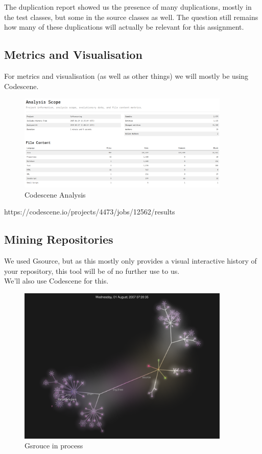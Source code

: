 \documentclass{article}
\begin{document}
The duplication report showed us the presence of many duplications, mostly in the test classes, but some in the source classes as well. The question still remains how many of these duplications will actually be relevant for this assignment.

\subsection{Metrics and Visualisation}

For metrics and visualisation (as well as other things) we will mostly be using Codescene.

\begin{figure}[H]
\centering
	\includegraphics[width=0.9\textwidth]{codescene_analysis.png}
	\caption{Codescene Analysis}
\end{figure}

https://codescene.io/projects/4473/jobs/12562/results

\newpage
\subsection{Mining Repositories}

We used Gsource, but as this mostly only provides a visual interactive history of your repository, this tool will be of no further use to us.\\

\noindent
We'll also use Codescene for this.


\begin{figure}[H]
\centering
	\includegraphics[width=0.9\textwidth]{gsource.png}
	\caption{Gsrouce in process}
\end{figure}
\end{document}
